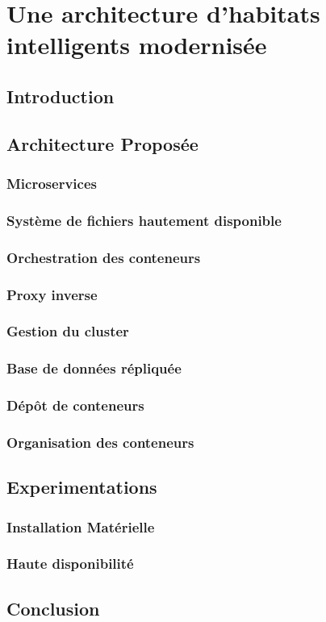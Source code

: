 \chapter{Une architecture d'habitats intelligents modernisée}
\label{chap:6}

\section{Introduction}

\section{Architecture Proposée}

\subsection{Microservices}

\subsection{Système de fichiers hautement disponible}
\subsection{Orchestration des conteneurs}
\subsection{Proxy inverse}
\subsection{Gestion du cluster}
\subsection{Base de données répliquée}
\subsection{Dépôt de conteneurs}
\subsection{Organisation des conteneurs}

\section{Experimentations}
\subsection{Installation Matérielle}
\subsection{Haute disponibilité}

\section{Conclusion}